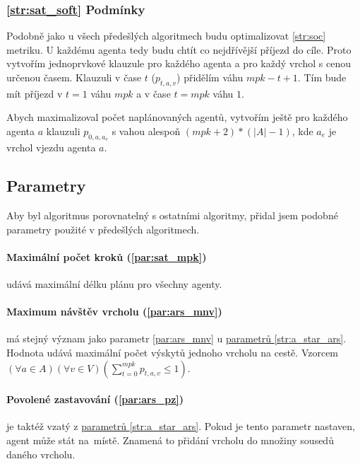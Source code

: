 \subsubsection{\ref{str:sat_soft} Podmínky}\label{subsubsec:sat_soft_podminky}

Podobně jako u všech předešlých algoritmech budu optimalizovat \ref{str:soc} metriku.
U každému agenta tedy budu chtít co nejdřívější příjezd do cíle.
Proto vytvořím jednoprvkové klauzule pro každého agenta a pro každý vrchol s cenou určenou časem.
Klauzuli v čase $t$ ($p_{t, a, v}$) přidělím váhu $mpk - t + 1$.
Tím bude mít příjezd v $t = 1$ váhu $mpk$ a v čase $t = mpk$ váhu $1$.

Abych maximalizoval počet naplánovaných agentů, vytvořím ještě pro každého agenta $a$
klauzuli $p_{0, a, a_e}$ s vahou alespoň $(mpk + 2) * (|A| - 1)$, kde $a_e$ je vrchol vjezdu agenta $a$.

\subsection{Parametry}\label{subsec:sat_parametry}

Aby byl algoritmus porovnatelný s ostatními algoritmy, přidal jsem podobné parametry použité v předešlých algoritmech.

\paragraph{Maximální počet kroků (\ref{par:sat_mpk})}
udává maximální délku plánu pro všechny agenty.

\paragraph{Maximum návštěv vrcholu (\ref{par:ars_mnv})} má stejný význam jako
parametr \ref{par:ars_mnv} u \hyperref[subsubsec:ars_parametry]{parametrů \ref{str:a_star_ars}}.
Hodnota udává maximální počet výskytů jednoho vrcholu na cestě.
Vzorcem $(\forall a \in A)(\forall v \in V)(\sum_{t=0}^{mpk} p_{t, a, v} \leq 1)$.

\paragraph{Povolené zastavování (\ref{par:ars_pz})}\label{par:sat_povolene_zastavovani} je taktéž vzatý
z \hyperref[subsubsec:ars_parametry]{parametrů \ref{str:a_star_ars}}.
Pokud je tento parametr nastaven, agent může stát na~místě.
Znamená to přidání vrcholu do množiny sousedů daného vrcholu.

